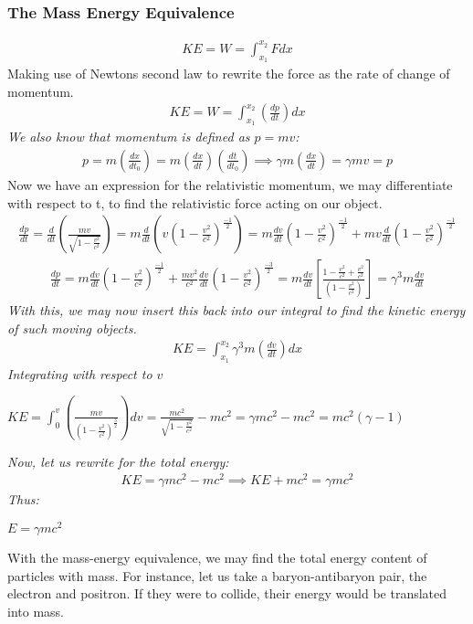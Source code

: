 \documentclass{article}
\begin{document}
{\subsubsection{The Mass Energy Equivalence}
\begin{gather*}
KE = W = \int_{x_1}^{x_2} Fdx
\end{gather*}
Making use of Newtons second law to rewrite the force as the rate of change of momentum. 
\begin{gather*}
	KE = W = \int_{x_1}^{x_2} \left(\frac{dp}{dt}\right)dx
\end{gather*}
\textit{We also know that momentum is defined as $p=mv$:}
\begin{gather*}
	p = m\left(\frac{dx}{dt_0}\right) = m\left(\frac{dx}{dt}\right)\left(\frac{dt}{dt_0}\right) \implies \gamma m \left(\frac{dx}{dt}\right) = \gamma mv = p
\end{gather*}
Now we have an expression for the relativistic momentum, we may differentiate with respect to t, to find the relativistic force acting on our object.
\begin{gather*}
	\frac{dp}{dt} = \frac{d}{dt}\left(\frac{mv}{\sqrt{1-\frac{v^2}{c^2}}}\right) = m\frac{d}{dt}\left(v\left(1-\frac{v^2}{c^2}\right)^{\frac{-1}{2}}\right) = m\frac{dv}{dt}\left(1-\frac{v^2}{c^2}\right)^{\frac{-1}{2}} + mv\frac{d}{dt}\left(1-\frac{v^2}{c^2}\right)^{\frac{-1}{2}}
\end{gather*}
\begin{gather*}
	\frac{dp}{dt} = m\frac{dv}{dt}\left(1-\frac{v^2}{c^2}\right)^{\frac{-1}{2}} + \frac{mv^2}{c^2}\frac{dv}{dt}\left(1-\frac{v^2}{c^2}\right)^{\frac{-3}{2}} = m\frac{dv}{dt}\left[\frac{1-\frac{v^2}{c^2}+\frac{v^2}{c^2}}{\left(1-\frac{v^2}{c^2}\right)}\right] = \gamma^3m\frac{dv}{dt}
\end{gather*}
\textit{With this, we may now insert this back into our integral to find the kinetic energy of such moving objects.}
\begin{gather*}
	KE = \int_{x_1}^{x_2} \gamma^3m\left(\frac{dv}{dt}\right)dx
\end{gather*}
\textit{Integrating with respect to $v$}
\begin{center}
	$
\boxed{KE = \int_{0}^{v} \left(\frac{mv}{\left(1-\frac{v^2}{c^2}\right)^{\frac{3}{2}}}\right)dv = \frac{mc^2}{\sqrt{1-{\frac{v^2}{c^2}}}} -mc^2 = \gamma mc^2 - mc^2 = mc^2(\gamma - 1)}
$
\end{center}
\textit{Now, let us rewrite for the total energy:}
\begin{gather*}
KE = \gamma mc^2 - mc^2 \implies KE + mc^2 = \gamma mc^2
\end{gather*}
\textit{Thus:}
\begin{center}
$\boxed{E = \gamma mc^2}
$
\end{center}
With the mass-energy equivalence, we may find the total energy content of particles with mass. For instance, let us take a baryon-antibaryon pair, the electron and positron. If they were to collide, their energy would be translated into mass. 
}
\end{document}
